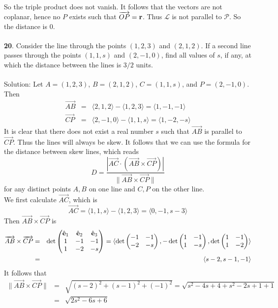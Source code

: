 \documentclass[12pt]{amsbook}
\newcommand{\la}{\langle}
\newcommand{\ra}{\rangle}
\begin{document}
So the triple product does not vanish. It follows that the vectors are not coplanar, hence no $P$ exists such that $\overrightarrow{OP}=\bf r$. Thus $\mathcal{L}$ is not parallel to $\mathcal{P}$. So the distance is 0.
\\
\\
{\small\bf 20}. Consider the line through the points $(1,2,3)$ and
$(2,1,2)$. If a second line passes through the points $(1,1,s)$
and $(2,-1,0)$, find all values of $s$, if any, at which the
distance between the lines is $3/2$ units.\\
\\
{\sc Solution}: Let $A=(1,2,3)$, $B=(2,1,2)$, $C=(1,1,s)$, and $P=(2,-1,0)$. Then
\begin{eqnarray*}
\overrightarrow{AB}&=&\la 2,1,2 \ra - \la 1,2,3 \ra = \la 1,-1,-1 \ra \\ 
\overrightarrow{CP}&=&\la 2,-1,0 \ra - \la 1,1,s \ra  = \la 1,-2,-s \ra  
\end{eqnarray*} 
It is clear that there does not exist a real number $s$ such that $\overrightarrow{AB}$ is parallel to $\overrightarrow{CP}$. Thus the lines will always be skew. It follows that we can use the formula for the distance between skew lines, which reads
$$D=\frac{|\overrightarrow{AC}\cdot(\overrightarrow{AB}\times\overrightarrow{CP})|}{\|\overrightarrow{AB}\times\overrightarrow{CP}\|}$$
for any distinct points $A,B$ on one line and $C,P$ on the other line.
\\
We first calculate $\overrightarrow{AC}$, which is 
$$\overrightarrow{AC}=\la 1,1,s \ra - \la 1,2,3 \ra = \la 0,-1,s-3 \ra $$
Then $\overrightarrow{AB}\times\overrightarrow{CP}$ is
\begin{eqnarray*}
\overrightarrow{AB}\times\overrightarrow{CP}&=&\det
\begin{pmatrix}
\hat{\bf e}_1 & \hat{\bf e}_2 & \hat{\bf e}_3\cr 1&-1&-1\cr 1&-2&-s \end{pmatrix}=\la \det\begin{pmatrix}-1&-1\cr -2&-s  \end{pmatrix}, -\det\begin{pmatrix}1&-1\cr 1&-s  \end{pmatrix}, \det\begin{pmatrix}1&-1\cr 1&-2 \end{pmatrix} \ra \\
&=& \la s-2,s-1,-1 \ra
\end{eqnarray*}
It follows that
\begin{eqnarray*}
\|\overrightarrow{AB}\times\overrightarrow{CP}\|&=&\sqrt{(s-2)^2+(s-1)^2+(-1)^2}=\sqrt{s^2-4s+4+s^2-2s+1+1}\\
&=&\sqrt{2s^2-6s+6}
\end{eqnarray*}
\end{document}
